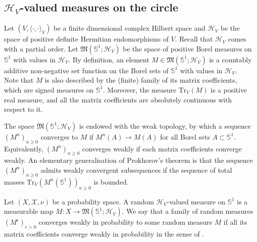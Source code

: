 \documentclass[12pt,a4paper]{amsart}
\numberwithin{equation}{section}
\theoremstyle{remark}
\theoremstyle{definition}
\renewcommand{\S}{\mathbb S}
\newcommand{\cH}{\mathcal{H}}
\begin{document}
        \subsection{\texorpdfstring{$\cH_V$-valued measures on the circle}{Matrix-valued measures on the circle}}\label{subsubsec:measures}


        
Let $(V,\langle\cdot,\cdot\rangle_V)$ be a finite dimensional complex Hilbert space and $\cH_V$ be the space of positive definite Hermitian endomorphisms of $V$. Recall that $\cH_V$ comes with a partial order. Let $\mathfrak M(\S^1;\cH_V)$ be the space of positive Borel measures on $\S^1$ with values in $\cH_V$. By definition, an element $M\in\mathfrak M(\S^1;\cH_V)$ is a countably additive non-negative set function on the Borel sets of $\S^1$ with values in $\cH_V$. Note that $M$ is also described by the (finite) family of its matrix coefficients, which are signed measures on $\S^1$. Moreover, the measure $\mathrm{Tr}_V(M)$ is a positive real measure, and all the matrix coefficients are absolutely continuous with respect to it. 

The space $\mathfrak M(\S^1;\cH_V)$ is endowed with the weak topology, by which a sequence $(M^n)_{n\geq0}$ converges to $M$ if $M^n(A)\to M(A)$ for all Borel sets $A\subset\S^1$. Equivalently, $(M^n)_{n\geq0}$ converges weakly if each matrix coefficients converge weakly. An elementary generalisation of Prokhorov's theorem is that the sequence $(M^n)_{n\geq0}$ admits weakly convergent subsequences if the sequence of total masses $\mathrm{Tr}_V(M^n(\S^1))_{n\geq0}$ is bounded. %

Let $(X,\mathcal{X},\nu)$ be a probability space. A random $\cH_V$-valued measure on $\S^1$ is a measurable map $M:X\to\mathfrak M(\S^1;\cH_V)$. We say that a family of random measures $(M^\epsilon)_{\epsilon>0}$ converges weakly in probability to some random measure $M$ if all its matrix coefficients converge weakly in probability in the sense of \cite{Berestycki}. %
\end{document}
